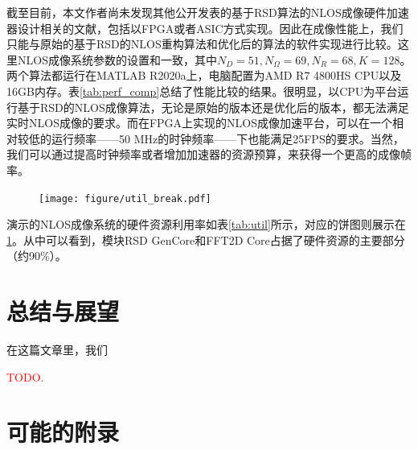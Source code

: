 \documentclass[master]{shtthesis}             %
\begin{document}
截至目前，本文作者尚未发现其他公开发表的基于RSD算法的NLOS成像硬件加速器设计相关的文献，包括以FPGA或者ASIC方式实现。因此在成像性能上，我们只能与原始的基于RSD的NLOS重构算法和优化后的算法的软件实现进行比较。这里NLOS成像系统参数的设置和\citet{Liu}一致，其中$N_D=51, N_\Omega=69, N_R=68, K=128$。两个算法都运行在MATLAB R2020a上，电脑配置为AMD R7 4800HS CPU以及16GB内存。表\ref{tab:perf_comp}总结了性能比较的结果。很明显，以CPU为平台运行基于RSD的NLOS成像算法，无论是原始的版本还是优化后的版本，都无法满足实时NLOS成像的要求。而在FPGA上实现的NLOS成像加速平台，可以在一个相对较低的运行频率——50 MHz的时钟频率——下也能满足25FPS的要求。当然，我们可以通过提高时钟频率或者增加加速器的资源预算，来获得一个更高的成像帧率。
\begin{table}[!t]
    \centering
    \label{tab:util}
\end{table}
\begin{figure}[!tb]
    \centering
    \texttt{[image: figure/util\_break.pdf]}
    \label{fig:util_break}
\end{figure}

演示的NLOS成像系统的硬件资源利用率如表\ref{tab:util}所示，对应的饼图则展示在\ref{fig:util_break}。从中可以看到，模块RSD GenCore和FFT2D Core占据了硬件资源的主要部分（约90\%）。

\chapter{总结与展望}

在这篇文章里，我们

\textcolor{red}{TODO.}

\makebiblio

\appendix
\chapter{可能的附录}
\end{document}
